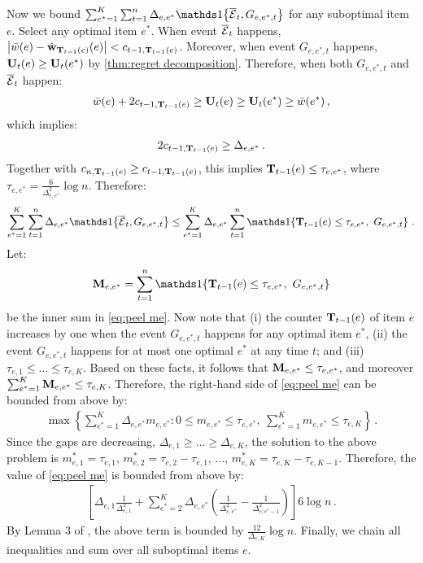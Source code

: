 Now we bound $\sum_{e^\ast = 1}^K \sum_{t = 1}^n \Delta_{e, e^\ast} \I{\ccE_t, G_{e, e^\ast, t}}$ for any suboptimal item $e$. Select any optimal item $e^\ast$. When event $\overline{\mathcal{E}}_t$ happens, $\left|\bar{w}(e) - \hat{\mathbf{w}}_{\mathbf{T}_{t - 1}(e)}(e)\right| < c_{t - 1, \mathbf{T}_{t - 1}(e)}$. Moreover, when event $G_{e, e^\ast, t}$ happens, $\mathbf{U}_t(e) \geq \mathbf{U}_t(e^\ast)$ by \cref{thm:regret decomposition}. Therefore, when both $G_{e, e^\ast, t}$ and $\overline{\mathcal{E}}_t$ happen:
\begin{align*}
  \bar{w}(e) + 2 c_{t - 1, \mathbf{T}_{t - 1}(e)} \geq
  \mathbf{U}_t(e) \geq
  \mathbf{U}_t(e^\ast) \geq
  \bar{w}(e^\ast)\,,
\end{align*}
which implies:
\begin{align*}
  2 c_{t - 1, \mathbf{T}_{t - 1}(e)} \geq \Delta_{e, e^\ast}\,.
\end{align*}
Together with $c_{n, \mathbf{T}_{t - 1}(e)} \geq c_{t - 1, \mathbf{T}_{t - 1}(e)}$, this implies $\mathbf{T}_{t - 1}(e) \leq \tau_{e, e^\ast}$, where $\tau_{e, e^\ast} = \frac{6}{\Delta_{e, e^\ast}^2} \log n$. Therefore:
\begin{align}
  \sum_{e^\ast = 1}^K \sum_{t = 1}^n \Delta_{e, e^\ast} \I{\ccE_t, G_{e, e^\ast, t}} \leq
  \sum_{e^\ast = 1}^K \Delta_{e, e^\ast} \sum_{t = 1}^n
  \I{\rnd{T}_{t - 1}(e) \leq \tau_{e, e^\ast}, \ G_{e, e^\ast, t}}\,.
  \label{eq:peel me}
\end{align}
Let:
\begin{align*}
  \rnd{M}_{e, e^\ast} = \sum_{t = 1}^n \I{\rnd{T}_{t - 1}(e) \leq \tau_{e, e^\ast}, \ G_{e, e^\ast, t}}
\end{align*}
be the inner sum in \eqref{eq:peel me}. Now note that (i) the counter $\mathbf{T}_{t - 1}(e)$ of item $e$ increases by one when the event $G_{e, e^\ast, t}$ happens for any optimal item $e^\ast$, (ii) the event $G_{e, e^\ast, t}$ happens for at most one optimal $e^\ast$ at any time $t$; and (iii) $\tau_{e, 1} \leq \ldots \leq \tau_{e, K}$. Based on these facts, it follows that $\mathbf{M}_{e, e^\ast} \leq \tau_{e, e^\ast}$, and moreover $\sum_{e^\ast = 1}^K \mathbf{M}_{e, e^\ast} \leq \tau_{e, K}$. Therefore, the right-hand side of \eqref{eq:peel me} can be bounded from above by:
\begin{align*}
  \max \left\{\sum_{e^\ast = 1}^K \Delta_{e, e^\ast} m_{e, e^\ast}:
  0 \leq m_{e, e^\ast} \leq \tau_{e, e^\ast}, \ \sum_{e^\ast = 1}^K m_{e, e^\ast} \leq \tau_{e, K}\right\}\,.
\end{align*}
Since the gaps are decreasing, $\Delta_{e, 1} \geq \ldots \geq \Delta_{e, K}$, the solution to the above problem is $m_{e, 1}^\ast = \tau_{e, 1}$, $m_{e, 2}^\ast = \tau_{e, 2} - \tau_{e, 1}$, $\dots$, $m_{e, K}^\ast = \tau_{e, K} - \tau_{e, K - 1}$. Therefore, the value of \eqref{eq:peel me} is bounded from above by:
\begin{align*}
  \left[\Delta_{e, 1} \frac{1}{\Delta_{e, 1}^2} + \sum_{e^\ast = 2}^K \Delta_{e, e^\ast}
  \left(\frac{1}{\Delta_{e, e^\ast}^2} - \frac{1}{\Delta_{e, e^\ast - 1}^2}\right)\right] 6 \log n\,.
\end{align*}
By Lemma 3 of \citet{kveton14matroid}, the above term is bounded by $\frac{12}{\Delta_{e, K}} \log n$. Finally, we chain all inequalities and sum over all suboptimal items $e$.


